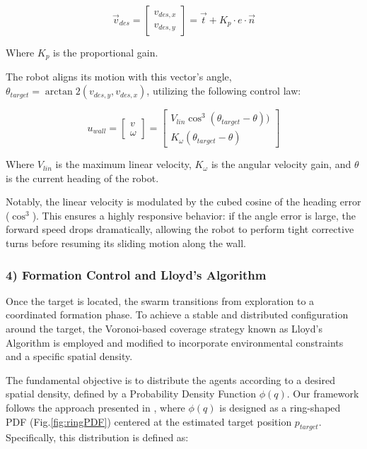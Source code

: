 \documentclass[times, twoside]{zHenriquesLab-StyleBioRxiv}
\begin{document}
\begin{equation}
\vec{v}_{des} = 
\begin{bmatrix} 
v_{des,x} \\ 
v_{des,y} 
\end{bmatrix}
= \vec{t} + K_p \cdot e \cdot \vec{n}
\end{equation}

Where $K_p$ is the proportional gain. 

The robot aligns its motion with this vector's angle, $\theta_{target} = \arctan2(v_{des,y}, v_{des,x})$, utilizing the following control law:

\begin{equation}
u_{wall} = 
\begin{bmatrix} 
v \\ 
\omega 
\end{bmatrix}
=
\begin{bmatrix} 
V_{lin} \cos^3(\theta_{target} - \theta)) \\ 
K_\omega (\theta_{target} - \theta) 
\end{bmatrix}
\label{eq:wall_follow_control}
\end{equation}

Where $V_{lin}$ is the maximum linear velocity, $K_\omega$ is the angular velocity gain, and $\theta$ is the current heading of the robot.

Notably, the linear velocity is modulated by the cubed cosine of the heading error ($\cos^3$). This ensures a highly responsive behavior: if the angle error is large, the forward speed drops dramatically, allowing the robot to perform tight corrective turns before resuming its sliding motion along the wall.


\subsubsection*{4) Formation Control and Lloyd's Algorithm}
Once the target is located, the swarm transitions from exploration to a coordinated formation phase. To achieve a stable and distributed configuration around the target, the Voronoi-based coverage strategy known as Lloyd's Algorithm is employed \cite{fontanelli, Loyd_usato} and modified to incorporate environmental constraints and a specific spatial density.

The fundamental objective is to distribute the agents according to a desired spatial density, defined by a Probability Density Function $\phi(q)$. Our framework follows the approach presented in \cite{Loyd_usato}, where $\phi(q)$ is designed as a ring-shaped PDF (Fig.\ref{fig:ringPDF}) centered at the estimated target position $p_{target}$. Specifically, this distribution is defined as:
\end{document}
